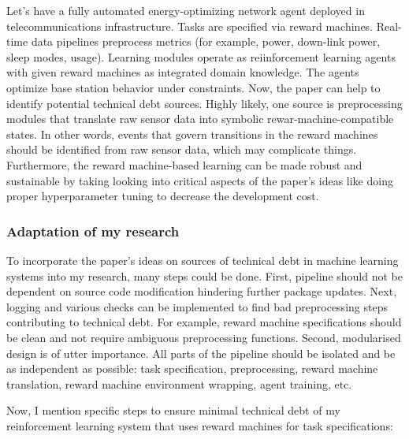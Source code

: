 \documentclass[a4paper,10pt]{article} %
\begin{document}
Let's have a fully automated energy-optimizing network agent deployed in telecommunications infrastructure.
Tasks are specified via reward machines.
Real-time data pipelines preprocess metrics (for example, power, down-link power, sleep modes, usage).
Learning modules operate as reiinforcement learning agents with given reward machines as integrated domain knowledge.
The agents optimize base station behavior under constraints.
Now, the paper can help to identify potential technical debt sources.
Highly likely, one source is preprocessing modules that translate raw sensor data into symbolic rewar-machine-compatible states.
In other words, events that govern transitions in the reward machines should be identified from raw sensor data, which may complicate things.
Furthermore, the reward machine-based learning can be made robust and sustainable by taking looking into critical aspects of the paper's ideas like doing proper hyperparameter tuning to decrease the development cost.

\subsubsection{Adaptation of my research}

To incorporate the paper's ideas on sources of technical debt in machine learning systems into my research, many steps could be done.
First, pipeline should not be dependent on source code modification hindering further package updates.
Next, logging and various checks can be implemented to find bad preprocessing steps contributing to technical debt.
For example, reward machine specifications should be clean and not require ambiguous preprocessing functions.
Second, modularised design is of utter importance.
All parts of the pipeline should be isolated and be as independent as possible: task specification, preprocessing, reward machine translation, reward machine environment wrapping, agent training, etc.

Now, I mention specific steps to ensure minimal technical debt of my reinforcement learning system that uses reward machines for task specifications:
\end{document}
